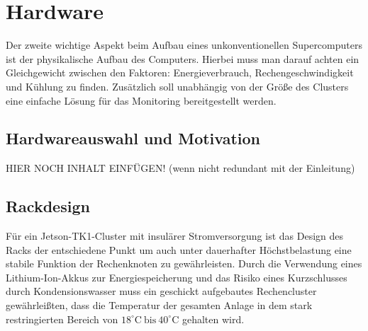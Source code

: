 \section{Hardware}
Der zweite wichtige Aspekt beim Aufbau eines unkonventionellen 
Supercomputers ist der physikalische Aufbau des Computers.
Hierbei muss man darauf achten ein Gleichgewicht zwischen den Faktoren: 
Energieverbrauch, Rechengeschwindigkeit und Kühlung zu finden.
Zusätzlich soll unabhängig von der Größe des Clusters eine
einfache Lösung für das Monitoring bereitgestellt werden.

\subsection{Hardwareauswahl und Motivation}
HIER NOCH INHALT EINFÜGEN! (wenn nicht redundant mit der Einleitung)


\subsection{Rackdesign}
Für ein Jetson-TK1-Cluster mit insulärer Stromversorgung
ist das Design des Racks der entschiedene Punkt um 
auch unter dauerhafter Höchstbelastung eine
stabile Funktion der Rechenknoten zu gewährleisten.
Durch die Verwendung eines Lithium-Ion-Akkus zur Energiespeicherung
und das Risiko eines Kurzschlusses durch Kondensionswasser muss
ein geschickt aufgebautes Rechencluster gewährleißten, dass die Temperatur
der gesamten Anlage in dem stark restringierten Bereich von 
$18^\circ\text{C}~\text{bis}~40^\circ \text{C}$ gehalten wird. 
